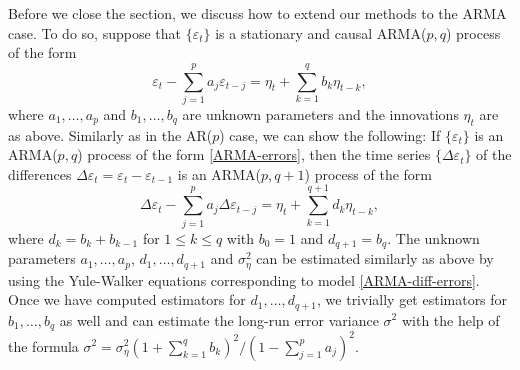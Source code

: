 Before we close the section, we discuss how to extend our methods to the ARMA case. To do so, suppose that $\{ \varepsilon_t \}$ is a stationary and causal ARMA($p,q$) process of the form 
\begin{equation}\label{ARMA-errors} 
\varepsilon_t - \sum_{j=1}^p a_j \varepsilon_{t-j} = \eta_t + \sum\limits_{k=1}^q b_k \eta_{t-k}, 
\end{equation} 
where $a_1,\ldots,a_p$ and $b_1,\ldots,b_q$ are unknown parameters and the innovations $\eta_t$ are as above. Similarly as in the AR($p$) case, we can show the following: If $\{\varepsilon_t\}$ is an ARMA($p,q$) process of the form \eqref{ARMA-errors}, then the time series $\{ \Delta \varepsilon_t \}$ of the differences $\Delta \varepsilon_t = \varepsilon_t - \varepsilon_{t-1}$ is an ARMA($p,q+1$) process of the form 
\begin{equation}\label{ARMA-diff-errors} 
\Delta \varepsilon_t - \sum_{j=1}^p a_j \Delta \varepsilon_{t-j} = \eta_t + \sum\limits_{k=1}^{q+1} d_k \eta_{t-k},
\end{equation}
where $d_k = b_k + b_{k-1}$ for $1 \le k \le q$ with $b_0 = 1$ and $d_{q+1} = b_q$. The unknown parameters $a_1,\ldots,a_p$, $d_1,\ldots,d_{q+1}$ and $\sigma_\eta^2$ can be estimated similarly as above by using the Yule-Walker equations corresponding to model \eqref{ARMA-diff-errors}. Once we have computed estimators for $d_1,\ldots,d_{q+1}$, we trivially get estimators for $b_1,\ldots,b_q$ as well and can estimate the long-run error variance $\sigma^2$ with the help of the formula $\sigma^2 = \sigma^2_\eta (1+\sum_{k=1}^q b_k)^2 / ( 1-\sum_{j=1}^p a_j)^2$. 




